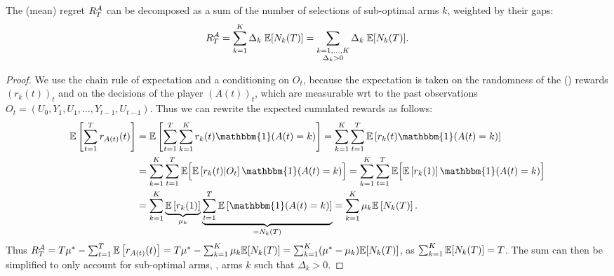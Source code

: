 \begin{lemma}\label{lem:2:RegretDecomposition}
    The (mean) regret $R_T^{\mathcal{A}}$ can be decomposed as a sum of the number of selections of sub-optimal arms $k$, weighted by their gaps:
    \begin{equation}\label{eq:2:RegretDecomposition}
        R_T^{\mathcal{A}} = \sum_{k=1}^K \Delta_k \; \mathbb{E}[ N_k(T) ]
        = \sum_{\substack{k=1,\dots,K\\\Delta_k > 0}} \Delta_k \; \mathbb{E}[ N_k(T) ].
    \end{equation}
\end{lemma}
%
\begin{proof}\label{proof:2:RegretDecomposition}
    We use the chain rule of expectation and a conditioning on $O_t$,
    because the expectation is taken on the randomness of the (\iid) rewards $(r_k(t))_t$ and on the decisions of the player $(A(t))_t$, which are measurable wrt to the past observations $O_t = (U_0, Y_1, U_1, \dots, Y_{t-1}, U_{t-1})$.
    Thus we can rewrite the expected cumulated rewards as follows:
    \begin{align*}
        \E \left[ \sum_{t=1}^T r_{A(t)}(t) \right]
        &= \E \left[ \sum_{t=1}^T \sum_{k=1}^K r_k(t) \mathbbm{1}(A(t) = k) \right]
        = \sum_{k=1}^K \sum_{t=1}^T \E \left[ r_k(t) \mathbbm{1}(A(t) = k) \right] \\
        &= \sum_{k=1}^K \sum_{t=1}^T \E \Bigl[ \E \left[ r_k(t) | O_t \right] \mathbbm{1}(A(t) = k) \Bigr]
        = \sum_{k=1}^K \sum_{t=1}^T \E \Bigl[ \E \left[ r_k(1) \right] \mathbbm{1}(A(t) = k) \Bigr] \\
        &= \sum_{k=1}^K \underbrace{\E \left[ r_k(1) \right]}_{\mu_k} \underbrace{\sum_{t=1}^T \E \left[ \mathbbm{1}(A(t) = k) \right]}_{= N_k(T)}
        = \sum_{k=1}^K \mu_k \E \left[ N_k(T) \right].
    \end{align*}
    Thus $R_T^{\mathcal{A}} = T \mu^* - \sum_{t=1}^T \mathbb{E}\left[ r_{A(t)}(t) \right] = T \mu^* - \sum_{k=1}^K \mu_k \mathbb{E}[ N_k(T) ] = \sum_{k=1}^K (\mu^* - \mu_k) \mathbb{E}[ N_k(T) ]$,
    as $\sum_{k=1}^K  \mathbb{E}[ N_k(T) ] = T$.
    The sum can then be simplified to only account for sub-optimal arms, \ie, arms $k$ such that $\Delta_k > 0$.
\end{proof}


